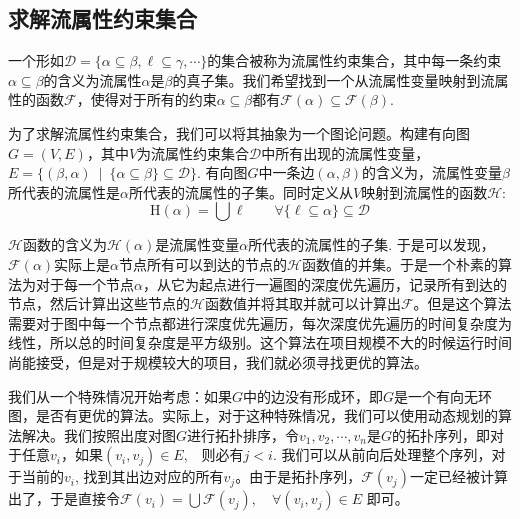 \documentclass[12pt, titlepage]{article}
\begin{document}
	\subsection{求解流属性约束集合}
	一个形如$\mathcal{D} = \{\alpha\subseteq\beta, \ell\subseteq\gamma, \cdots\}$的集合被称为流属性约束集合，其中每一条约束$\alpha\subseteq\beta$的含义为流属性$\alpha$是$\beta$的真子集。我们希望找到一个从流属性变量映射到流属性的函数$\mathcal{F}$，使得对于所有的约束$\alpha\subseteq\beta$都有$\mathcal{F}(\alpha)\subseteq\mathcal{F}(\beta)$. 
	
	为了求解流属性约束集合，我们可以将其抽象为一个图论问题。构建有向图$G = (V, E)$，其中$V$为流属性约束集合$\mathcal{D}$中所有出现的流属性变量，$E = \{(\beta, \alpha)\ \mid\ \{\alpha\subseteq\beta\}\subseteq\mathcal{D}\}$. 	有向图$G$中一条边$(\alpha, \beta)$的含义为，流属性变量$\beta$所代表的流属性是$\alpha$所代表的流属性的子集。同时定义从$V$映射到流属性的函数$\mathcal{H}$:
	\begin{equation*}
		\mathrm{H}(\alpha) = \bigcup\ell\qquad\forall\{\ell\subseteq\alpha\}\subseteq\mathcal{D}
	\end{equation*}
	
	$\mathcal{H}$函数的含义为$\mathcal{H}(\alpha)$是流属性变量$\alpha$所代表的流属性的子集. 于是可以发现，$\mathcal{F}(\alpha)$实际上是$\alpha$节点所有可以到达的节点的$\mathcal{H}$函数值的并集。于是一个朴素的算法为对于每一个节点$\alpha$，从它为起点进行一遍图的深度优先遍历，记录所有到达的节点，然后计算出这些节点的$\mathcal{H}$函数值并将其取并就可以计算出$\mathcal{F}$。但是这个算法需要对于图中每一个节点都进行深度优先遍历，每次深度优先遍历的时间复杂度为线性，所以总的时间复杂度是平方级别。这个算法在项目规模不大的时候运行时间尚能接受，但是对于规模较大的项目，我们就必须寻找更优的算法。
	
	我们从一个特殊情况开始考虑：如果$G$中的边没有形成环，即$G$是一个有向无环图，是否有更优的算法。实际上，对于这种特殊情况，我们可以使用动态规划的算法解决。我们按照出度对图$G$进行拓扑排序，令$v_1, v_2, \cdots, v_n$是$G$的拓扑序列，即对于任意$v_i$，如果$(v_i, v_j) \in E$,　则必有$j < i$. 我们可以从前向后处理整个序列，对于当前的$v_i$, 找到其出边对应的所有$v_j$。由于是拓扑序列，$\mathcal{F}(v_j)$一定已经被计算出了，于是直接令$\mathcal{F}(v_i) = \bigcup\mathcal{F}(v_j),\quad\forall(v_i, v_j)\in E$ 即可。
	
\end{document}
